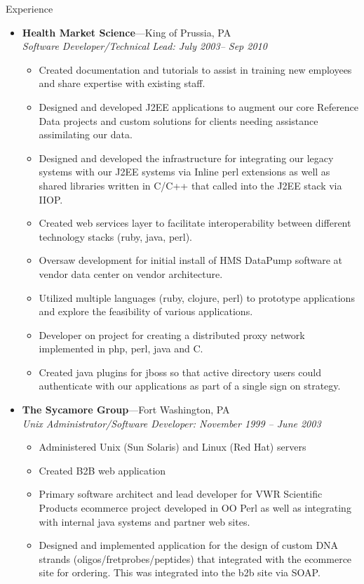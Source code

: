 \documentclass[11pt,oneside]{article}
\newenvironment{ressection}[1]{
	\vspace{4pt}
	{\fontfamily{phv}\selectfont\Large#1}
	\begin{itemize}
	\vspace{3pt}
}{
	\end{itemize}
}
\newcommand{\ressubitem}[1]{
	\vspace{-1pt}
	\item \begin{flushleft} #1 \end{flushleft}
}
\newcommand{\resbigitem}[3]{
	\vspace{-5pt}
	\item
	\textbf{#1}---#2 \\
	\textit{#3}
}
\newenvironment{ressubsec}[3]{
	\resbigitem{#1}{#2}{#3}
	\vspace{-2pt}
	\begin{itemize}
}{
	\end{itemize}
}
\begin{document}
\begin{ressection}{Experience}
\begin{ressubsec}{Health Market Science}{King of Prussia, PA}{Software Developer/Technical Lead: July 2003-- Sep 2010}
	  \ressubitem{Created documentation and tutorials to assist in
            training new employees and share expertise with existing
            staff.}

	  \ressubitem{Designed and developed J2EE applications to
            augment our core Reference Data projects and custom
            solutions for clients needing assistance assimilating our
            data.}

	  \ressubitem{Designed and developed the infrastructure for
            integrating our legacy systems with our J2EE systems via
            Inline perl extensions as well as shared libraries written
            in C/C++ that called into the J2EE stack via IIOP.}

          \ressubitem{Created web services layer to facilitate
            interoperability between different technology stacks
            (ruby, java, perl).}

	  \ressubitem{Oversaw development for initial install of HMS
            DataPump software at vendor data center on vendor
            architecture.}

	  \ressubitem{Utilized multiple languages (ruby, clojure,
            perl) to prototype applications and explore the
            feasibility of various applications.}

	  \ressubitem{Developer on project for creating a distributed
            proxy network implemented in php, perl, java and C.}

          \ressubitem{Created java plugins for jboss so that active
            directory users could authenticate with our applications
            as part of a single sign on strategy.}

	\end{ressubsec}

	\begin{ressubsec}{The Sycamore Group}{Fort Washington, PA}{Unix Administrator/Software Developer: November 1999 -- June 2003}

	  \ressubitem{Administered Unix (Sun Solaris) and Linux (Red Hat) servers}

	  \ressubitem{Created B2B web application}

	  \ressubitem{Primary software architect and lead developer
            for VWR Scientific Products ecommerce project developed in
            OO Perl as well as integrating with internal java systems
            and partner web sites. }

	  \ressubitem{Designed and implemented application for the
            design of custom DNA strands (oligos/fretprobes/peptides)
            that integrated with the ecommerce site for ordering. This
            was integrated into the b2b site via SOAP.}


\end{ressubsec}
\end{ressection}
\end{document}
